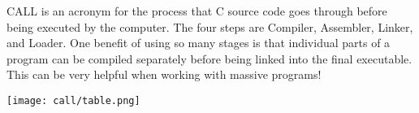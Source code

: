 \begin{blocksection}
CALL is an acronym for the process that C source code goes through before being executed by the computer. The four steps are Compiler, Assembler, Linker, and Loader. 
One benefit of using so many stages is that individual parts of a program can be compiled separately before being linked into the final executable. 
This can be very helpful when working with massive programs!

\texttt{[image: call/table.png]}

\end{blocksection}